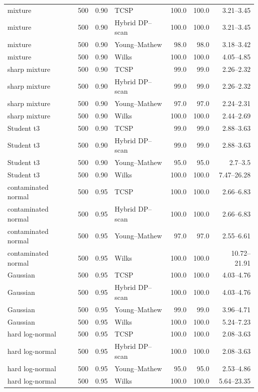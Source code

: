\begin{longtable}{@{}p{}rrp{}rrr@{}}
mixture & 500 & 0.90 & TCSP & 100.0 & 100.0 & 3.21--3.45 \\
mixture & 500 & 0.90 & Hybrid DP--scan & 100.0 & 100.0 & 3.21--3.45 \\
mixture & 500 & 0.90 & Young--Mathew & 98.0 & 98.0 & 3.18--3.42 \\
mixture & 500 & 0.90 & Wilks & 100.0 & 100.0 & 4.05--4.85 \\
sharp mixture & 500 & 0.90 & TCSP & 99.0 & 99.0 & 2.26--2.32 \\
sharp mixture & 500 & 0.90 & Hybrid DP--scan & 99.0 & 99.0 & 2.26--2.32 \\
sharp mixture & 500 & 0.90 & Young--Mathew & 97.0 & 97.0 & 2.24--2.31 \\
sharp mixture & 500 & 0.90 & Wilks & 100.0 & 100.0 & 2.44--2.69 \\
Student t3 & 500 & 0.90 & TCSP & 99.0 & 99.0 & 2.88--3.63 \\
Student t3 & 500 & 0.90 & Hybrid DP--scan & 99.0 & 99.0 & 2.88--3.63 \\
Student t3 & 500 & 0.90 & Young--Mathew & 95.0 & 95.0 & 2.7--3.5 \\
Student t3 & 500 & 0.90 & Wilks & 100.0 & 100.0 & 7.47--26.28 \\
contaminated normal & 500 & 0.95 & TCSP & 100.0 & 100.0 & 2.66--6.83 \\
contaminated normal & 500 & 0.95 & Hybrid DP--scan & 100.0 & 100.0 & 2.66--6.83 \\
contaminated normal & 500 & 0.95 & Young--Mathew & 97.0 & 97.0 & 2.55--6.61 \\
contaminated normal & 500 & 0.95 & Wilks & 100.0 & 100.0 & 10.72--21.91 \\
Gaussian & 500 & 0.95 & TCSP & 100.0 & 100.0 & 4.03--4.76 \\
Gaussian & 500 & 0.95 & Hybrid DP--scan & 100.0 & 100.0 & 4.03--4.76 \\
Gaussian & 500 & 0.95 & Young--Mathew & 99.0 & 99.0 & 3.96--4.71 \\
Gaussian & 500 & 0.95 & Wilks & 100.0 & 100.0 & 5.24--7.23 \\
hard log-normal & 500 & 0.95 & TCSP & 100.0 & 100.0 & 2.08--3.63 \\
hard log-normal & 500 & 0.95 & Hybrid DP--scan & 100.0 & 100.0 & 2.08--3.63 \\
hard log-normal & 500 & 0.95 & Young--Mathew & 95.0 & 95.0 & 2.53--4.86 \\
hard log-normal & 500 & 0.95 & Wilks & 100.0 & 100.0 & 5.64--23.35 \\

\end{longtable}
